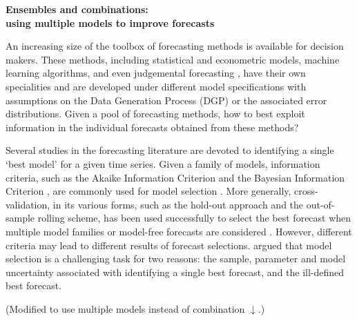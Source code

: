 \documentclass[11pt]{article}
\begin{document}
\def\spacingset#1{\renewcommand{\baselinestretch}%
{#1}\small\normalsize} \spacingset{1}

\begin{center}
{\bf\Large Ensembles and combinations: \\using multiple models to improve forecasts}
\end{center}


\bigskip


\spacingset{1.5} 


An increasing size of the toolbox of forecasting methods is available for decision makers. These methods, including statistical and econometric models, machine learning algorithms, and even judgemental forecasting \citep[see an encyclopedic overview by][]{petropoulos2020forecasting}, have their own specialities and are developed under different model specifications with assumptions on the Data Generation Process (DGP) or the associated error distributions. Given a pool of forecasting methods, how to best exploit information in the individual forecasts obtained from these methods?

Several studies in the forecasting literature are devoted to identifying a single `best model' for a given time series. Given a family of models, information criteria, such as the Akaike Information Criterion \citep[AIC,][]{akaike1998information} and the Bayesian Information Criterion \citep[BIC,][]{schwarz1978estimating}, are commonly used for model selection \citep[e.g.,][]{qi2001investigation,billah2005empirical,yang2005can}. More generally, cross-validation, in its various forms, such as the hold-out approach and the out-of-sample rolling scheme, has been used successfully to select the best forecast when multiple model families or model-free forecasts are considered \citep[e.g.,][]{kohavi1995study,poler2011forecasting,fildes2015simple,inoue2017rolling,talagala2018meta}. However, different criteria may lead to different results of forecast selections. \cite{Kourentzes2019-na} argued that model selection is a challenging task for two reasons: the sample, parameter and model uncertainty associated with identifying a single best forecast, and the ill-defined best forecast.

{\color{red} (Modified to use multiple models instead of combination $\downarrow$.)}
\end{document}
